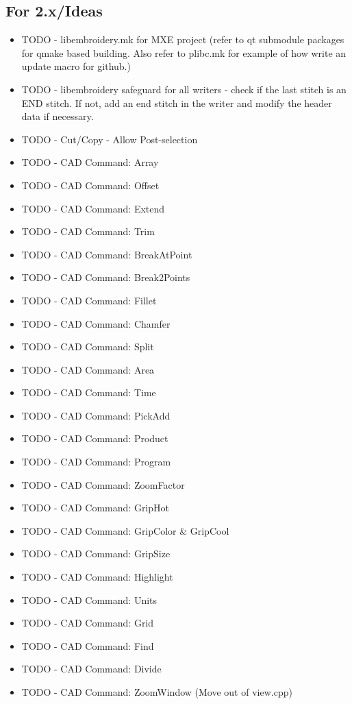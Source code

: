 \documentclass{report}
\begin{document}
\subsection{For 2.x/Ideas}

\begin{itemize}
\item TODO - libembroidery.mk for MXE project (refer to qt submodule packages for qmake based building. Also refer to plibc.mk for example of how write an update macro for github.)
\item TODO - libembroidery safeguard for all writers - check if the last stitch is an END stitch. If not, add an end stitch in the writer and modify the header data if necessary.
\item TODO - Cut/Copy - Allow Post-selection
\item TODO - CAD Command: Array
\item TODO - CAD Command: Offset
\item TODO - CAD Command: Extend
\item TODO - CAD Command: Trim
\item TODO - CAD Command: BreakAtPoint
\item TODO - CAD Command: Break2Points
\item TODO - CAD Command: Fillet
\item TODO - CAD Command: Chamfer
\item TODO - CAD Command: Split
\item TODO - CAD Command: Area
\item TODO - CAD Command: Time
\item TODO - CAD Command: PickAdd
\item TODO - CAD Command: Product
\item TODO - CAD Command: Program
\item TODO - CAD Command: ZoomFactor
\item TODO - CAD Command: GripHot
\item TODO - CAD Command: GripColor \& GripCool
\item TODO - CAD Command: GripSize
\item TODO - CAD Command: Highlight
\item TODO - CAD Command: Units
\item TODO - CAD Command: Grid
\item TODO - CAD Command: Find
\item TODO - CAD Command: Divide
\item TODO - CAD Command: ZoomWindow (Move out of view.cpp)

\end{itemize}
\end{document}
